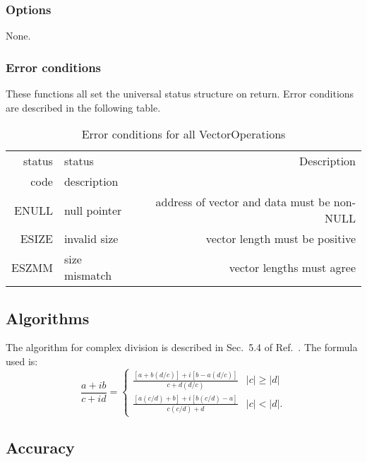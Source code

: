 \documentclass{article}
\begin{document}
\subsubsection{Options}

None. 

\subsubsection{Error conditions}


These functions all set the universal status structure on return.
Error conditions are described in the following table.

\begin{table}
\begin{tabular}{|r|l|r|}\hline
status & status        & Description\\
code   & description   & \\\hline
ENULL  & null pointer  & address of vector and data must be non-NULL\\
ESIZE  & invalid size  & vector length must be positive\\
ESZMM  & size mismatch & vector lengths must agree\\
\hline
\end{tabular}
\caption{Error conditions for all VectorOperations}\label{tbl:CV}
\end{table}
                                
\subsection{Algorithms}

The algorithm for complex division is described in
Sec.~5.4 of Ref.~\cite{ptvf:1992}.  The formula used is:
\[
  \frac{a + ib}{c + id} = \left\{
  \begin{array}{ll}
    \frac{[a + b(d/c)] + i[b - a(d/c)]}{c + d(d/c)} & |c| \ge |d| \\
    \frac{[a(c/d) + b] + i[b(c/d) - a]}{c(c/d) + d} & |c| < |d|.
  \end{array}
  \right.
\]


\subsection{Accuracy}
\end{document}
